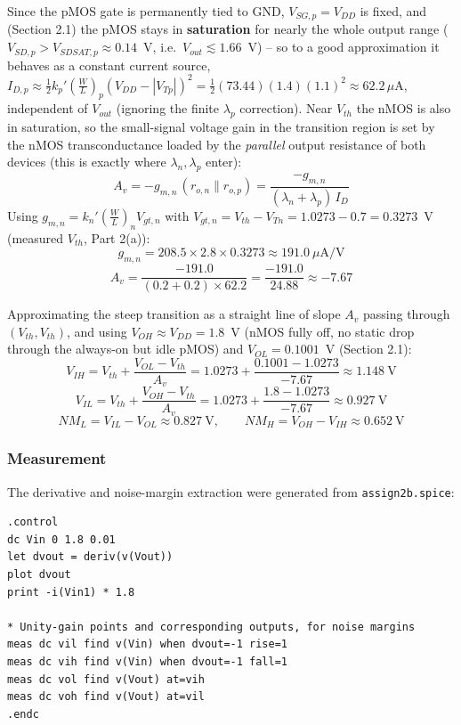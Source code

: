 Since the pMOS gate is permanently tied to GND, $V_{SG,p}=V_{DD}$ is fixed, and
(Section 2.1) the pMOS stays in \textbf{saturation} for nearly the whole output
range ($V_{SD,p}>V_{SDSAT,p}\approx0.14$~V, i.e.\ $V_{out}\lesssim1.66$~V) -- so
to a good approximation it behaves as a constant current source,
$I_{D,p}\approx\frac{1}{2}k_p'\left(\frac{W}{L}\right)_p(V_{DD}-|V_{Tp}|)^2 =
\frac{1}{2}(73.44)(1.4)(1.1)^2\approx62.2\,\mu\text{A}$, independent of
$V_{out}$ (ignoring the finite $\lambda_p$ correction). Near $V_{th}$ the nMOS
is also in saturation, so the small-signal voltage gain in the transition region
is set by the nMOS transconductance loaded by the \emph{parallel} output
resistance of both devices (this is exactly where $\lambda_n,\lambda_p$ enter):
\[
A_v = -g_{m,n}\,(r_{o,n}\|r_{o,p}) = \frac{-g_{m,n}}{(\lambda_n+\lambda_p)\,I_D}
\]
Using $g_{m,n}=k_n'\left(\frac{W}{L}\right)_n V_{gt,n}$ with
$V_{gt,n}=V_{th}-V_{Tn}=1.0273-0.7=0.3273$~V (measured $V_{th}$, Part 2(a)):
\[
g_{m,n} = 208.5\times2.8\times0.3273 \approx 191.0\ \mu\text{A/V}
\]
\[
A_v = \frac{-191.0}{(0.2+0.2)\times62.2} = \frac{-191.0}{24.88} \approx -7.67
\]

Approximating the steep transition as a straight line of slope $A_v$ passing
through $(V_{th},V_{th})$, and using $V_{OH}\approx V_{DD}=1.8$~V (nMOS fully
off, no static drop through the always-on but idle pMOS) and $V_{OL}=0.1001$~V
(Section 2.1):
\[
V_{IH} = V_{th} + \frac{V_{OL}-V_{th}}{A_v} = 1.0273 +
\frac{0.1001-1.0273}{-7.67} \approx 1.148\ \text{V}
\]
\[
V_{IL} = V_{th} + \frac{V_{OH}-V_{th}}{A_v} = 1.0273 + \frac{1.8-1.0273}{-7.67}
\approx 0.927\ \text{V}
\]
\[
NM_L = V_{IL}-V_{OL} \approx 0.827\ \text{V}, \qquad NM_H = V_{OH}-V_{IH} \approx
0.652\ \text{V}
\]

\subsubsection{Measurement}

The derivative and noise-margin extraction were generated from
\texttt{assign2b.spice}:

\begin{verbatim}
.control
dc Vin 0 1.8 0.01
let dvout = deriv(v(Vout))
plot dvout
print -i(Vin1) * 1.8

* Unity-gain points and corresponding outputs, for noise margins
meas dc vil find v(Vin) when dvout=-1 rise=1
meas dc vih find v(Vin) when dvout=-1 fall=1
meas dc vol find v(Vout) at=vih
meas dc voh find v(Vout) at=vil
.endc
\end{verbatim}


